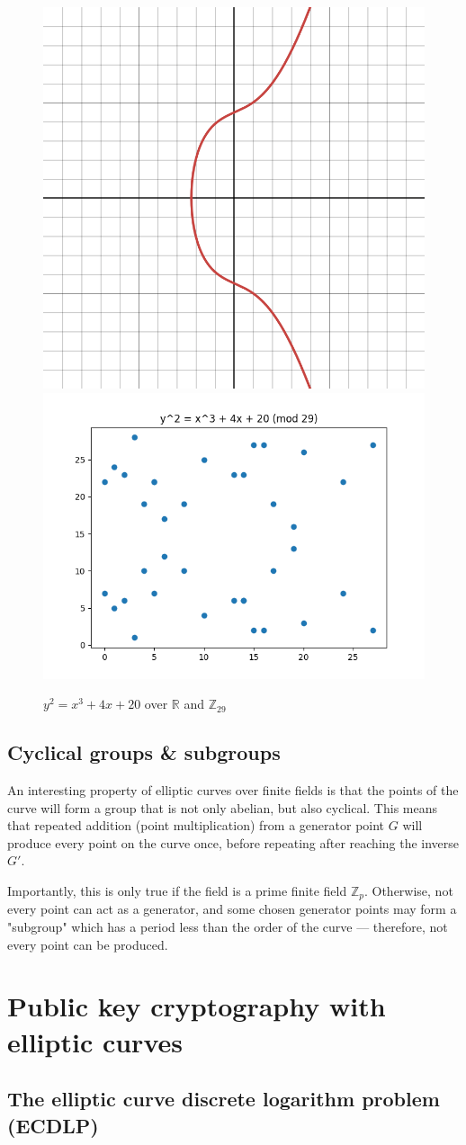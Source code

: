 \documentclass[a4paper]{article}
\begin{document}
\begin{figure}[h]
    \centering
    \includegraphics[width=0.3\linewidth]{images/finite-graph.png}
    \includegraphics[width=0.4\linewidth]{images/finite-plt.png}
    \caption{$y^2=x^3+4x+20$ over $\mathbb{R}$ and $\mathbb{Z}_{29}$}
    \label{fig:finite}
\end{figure}

\subsection{Cyclical groups \& subgroups}

An interesting property of elliptic curves over finite fields is that the points of the curve will form a group that is not only abelian, but also cyclical. This means that repeated addition (point multiplication) from a generator point $G$ will produce every point on the curve once, before repeating after reaching the inverse $G'$.

Importantly, this is only true if the field is a prime finite field $\mathbb{Z}_p$. Otherwise, not every point can act as a generator, and some chosen generator points may form a "subgroup" which has a period less than the order of the curve --- therefore, not every point can be produced.\cite{practical}


\section{Public key cryptography with elliptic curves}

\subsection{The elliptic curve discrete logarithm problem (ECDLP)}\label{ecdlp}
\end{document}
